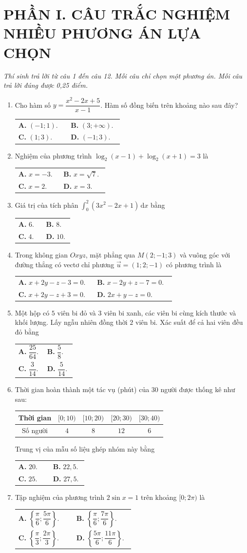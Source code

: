 \documentclass[12pt,a4paper]{article}
\makeatletter
\newcommand{\bonpa}[4]{\par\smallskip\noindent
  \begin{tabular}{@{}p{0.47\linewidth}p{0.47\linewidth}@{}}
  \textbf{A.} #1 & \textbf{B.} #2\\[3pt]
  \textbf{C.} #3 & \textbf{D.} #4
  \end{tabular}}
\makeatother
\begin{document}
\section*{\large PHẦN I. CÂU TRẮC NGHIỆM NHIỀU PHƯƠNG ÁN LỰA CHỌN}
\textit{Thí sinh trả lời từ câu 1 đến câu 12. Mỗi câu chỉ chọn một phương án. Mỗi câu trả lời đúng được 0,25 điểm.}
\begin{enumerate}
\item Cho hàm số $y=\dfrac{x^2-2x+5}{x-1}$. Hàm số đồng biến trên khoảng nào sau đây?
\bonpa{$(-1;1)$.}{$(3;+\infty)$.}{$(1;3)$.}{$(-1;3)$.}

\item Nghiệm của phương trình $\log_2(x-1)+\log_2(x+1)=3$ là
\bonpa{$x=-3$.}{$x=\sqrt{7}$.}{$x=2$.}{$x=3$.}

\item Giá trị của tích phân $\displaystyle\int_0^2(3x^2-2x+1)\,\mathrm{d}x$ bằng
\bonpa{$6$.}{$8$.}{$4$.}{$10$.}

\item Trong không gian $Oxyz$, mặt phẳng qua $M(2;-1;3)$ và vuông góc với đường thẳng có vectơ chỉ phương $\vec u=(1;2;-1)$ có phương trình là
\bonpa{$x+2y-z-3=0$.}{$x-2y+z-7=0$.}{$x+2y-z+3=0$.}{$2x+y-z=0$.}

\item Một hộp có $5$ viên bi đỏ và $3$ viên bi xanh, các viên bi cùng kích thước và khối lượng. Lấy ngẫu nhiên đồng thời $2$ viên bi. Xác suất để cả hai viên đều đỏ bằng
\bonpa{$\dfrac{25}{64}$.}{$\dfrac{5}{8}$.}{$\dfrac{3}{14}$.}{$\dfrac{5}{14}$.}

\item Thời gian hoàn thành một tác vụ (phút) của $30$ người được thống kê như sau:
\begin{center}
\begin{tabular}{|c|c|c|c|c|}\hline
Thời gian & $[0;10)$ & $[10;20)$ & $[20;30)$ & $[30;40)$\\\hline
Số người & $4$ & $8$ & $12$ & $6$\\\hline
\end{tabular}
\end{center}
Trung vị của mẫu số liệu ghép nhóm này bằng
\bonpa{$20$.}{$22{,}5$.}{$25$.}{$27{,}5$.}

\item Tập nghiệm của phương trình $2\sin x=1$ trên khoảng $[0;2\pi)$ là
\bonpa{$\left\{\dfrac{\pi}{6};\dfrac{5\pi}{6}\right\}$.}{$\left\{\dfrac{\pi}{6};\dfrac{7\pi}{6}\right\}$.}{$\left\{\dfrac{\pi}{3};\dfrac{2\pi}{3}\right\}$.}{$\left\{\dfrac{5\pi}{6};\dfrac{11\pi}{6}\right\}$.}


\end{enumerate}
\end{document}
